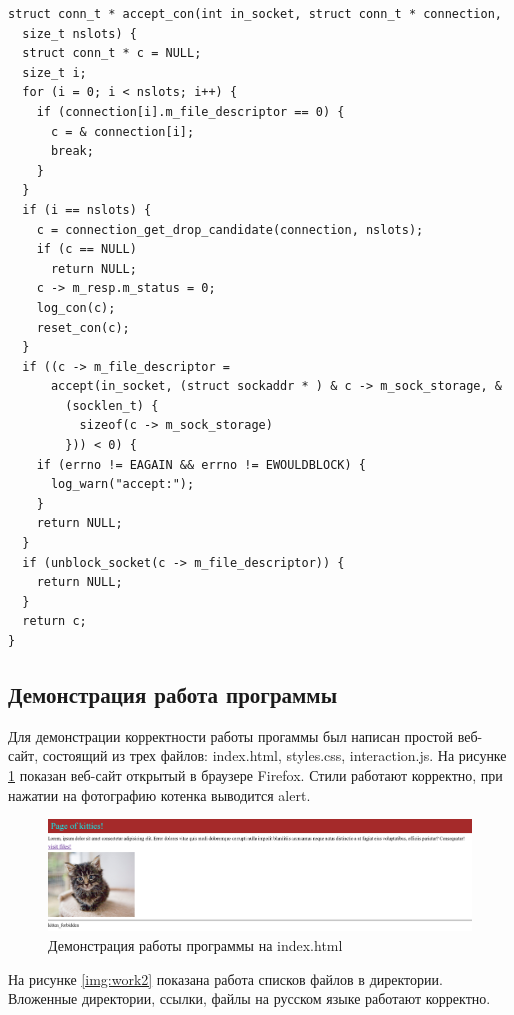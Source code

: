 \captionsetup{singlelinecheck = false, justification=raggedright}
\begin{lstlisting}[label=lst:conn,caption=Установка соединение]
struct conn_t * accept_con(int in_socket, struct conn_t * connection,
  size_t nslots) {
  struct conn_t * c = NULL;
  size_t i;
  for (i = 0; i < nslots; i++) {
    if (connection[i].m_file_descriptor == 0) {
      c = & connection[i];
      break;
    }
  }
  if (i == nslots) {
    c = connection_get_drop_candidate(connection, nslots);
    if (c == NULL)
      return NULL;
    c -> m_resp.m_status = 0;
    log_con(c);
    reset_con(c);
  }
  if ((c -> m_file_descriptor =
      accept(in_socket, (struct sockaddr * ) & c -> m_sock_storage, &
        (socklen_t) {
          sizeof(c -> m_sock_storage)
        })) < 0) {
    if (errno != EAGAIN && errno != EWOULDBLOCK) {
      log_warn("accept:");
    }
    return NULL;
  }
  if (unblock_socket(c -> m_file_descriptor)) {
    return NULL;
  }
  return c;
}
\end{lstlisting}

\subsection{Демонстрация работа программы}

Для демонстрации корректности работы прогаммы был написан простой веб-сайт, состоящий из трех файлов: index.html, styles.css, interaction.js. На рисунке \ref{img:work1} показан веб-сайт открытый в браузере Firefox. Стили работают корректно, при нажатии на фотографию котенка выводится alert.

\begin{figure}[H]
    \begin{center}
        \includegraphics[width=0.95\linewidth]{inc/img/work1.png}
        \caption{Демонстрация работы программы на index.html}
        \label{img:work1}
    \end{center}
\end{figure}

На рисунке \ref{img:work2} показана работа списков файлов в директории. Вложенные директории, ссылки, файлы на русском языке работают корректно.

